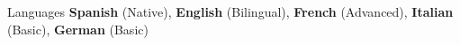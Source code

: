 \begin{rubric}{Languages}
    \textbf{Spanish} (Native), \qquad \textbf{English} (Bilingual), \qquad \textbf{French} (Advanced), \qquad \textbf{Italian} (Basic),  \qquad \textbf{German} (Basic)
\end{rubric}
